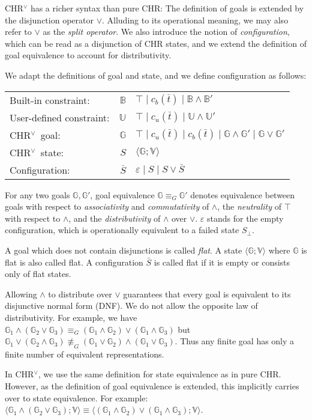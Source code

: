 \documentclass[acmtocl]{acmtrans2m}
\newcommand\state[1]{\langle #1 \rangle}
\newcommand{\B}{\ensuremath{\mathbb{B}}}
\newcommand{\U}{\ensuremath{\mathbb{U}}}
\newcommand{\V}{\ensuremath{\mathbb{V}}}
\newcommand{\G}{\ensuremath{\mathbb{G}}}
\newcommand{\cb}{\ensuremath{c_b(\bar t)}}
\newcommand{\cu}{\ensuremath{c_u(\bar t)}}
\newcommand{\bS}{\bar{S}}
\newcommand{\chrv}{CHR$^\vee$}
\begin{document}
CHR$^\vee$ has a richer syntax than pure CHR: The definition of goals
is extended by the disjunction operator $\vee$. Alluding to its operational meaning,
we may also refer to $\vee$ as the \emph{split operator}. We also introduce the
notion of \emph{configuration}, which can be read as a disjunction of CHR states,
and we extend the definition of goal equivalence to account for
distributivity.

\begin{definition}
	\label{chrv-state-conf}
We adapt the definitions of goal and state, and we define configuration as
follows:

\medskip
\begin{tabular}{l @{\quad} r @{\,::=\,} l}
	Built-in constraint: &
		$\B$ &
			$\top \mid \cb \mid \B\wedge\B'$\\
	User-defined constraint: &
		$\U$ &
			$\top \mid \cu \mid \U\wedge\U'$\\
	\chrv\ goal: &
		$\G$ &
			$\top \mid \cu \mid \cb \mid \G \wedge \G' \mid \G\vee\G'$\\
	\chrv\ state: &
		$S$  &
			$\state{\G;\V}$ \\
	Configuration: &
		$\bS$ &
			$\varepsilon \mid S \mid S\vee\bS$
\end{tabular}

\medskip For any two goals $\G,\G'$, goal equivalence $\G\equiv_{G}\G'$ denotes
equivalence between goals with respect to \emph{associativity} and
\emph{commutativity} of $\wedge$, the \emph{neutrality} of $\top$ with respect to
$\wedge$, and the \emph{distributivity} of $\wedge$ over $\vee$. $\varepsilon$
stands for the empty configuration, which is operationally equivalent to a
failed state $S_\bot$.

A goal which does not contain disjunctions is called \emph{flat}. A
state $\state{\G;\V}$ where $\G$ is flat is also called flat. A
configuration $\bS$ is called flat if it is empty or consists only of flat
states.
\end{definition}

Allowing $\wedge$ to distribute over $\vee$ guarantees that every goal is
equivalent to its disjunctive normal form (DNF). We do not allow the opposite
law of distributivity. For example, we have $\G_1\wedge(\G_2\vee\G_3)\equiv_G
(\G_1\wedge\G_2)\vee(\G_1\wedge\G_3)$ but $\G_1\vee(\G_2\wedge\G_3)\not\equiv_G
(\G_1\vee\G_2)\wedge(\G_1\vee\G_3)$. Thus any finite goal has only a finite
number of equivalent representations.

In CHR$^\vee$, we use the same definition for state equivalence as in pure CHR.
However, as the
definition of goal equivalence is extended, this implicitly carries over to
state equivalence. For example:
$\state{\G_1\wedge(\G_2\vee\G_3);\V}\equiv\state{(\G_1\wedge\G_2)\vee(\G_1\wedge\G_3);\V}$.
\end{document}
